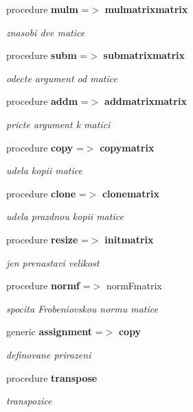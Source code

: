 \begin{DoxyCompactItemize}
procedure {\bf mulm} =$>$ {\bf mulmatrixmatrix}
\begin{DoxyCompactList}\small\item\em znasobi dve matice \end{DoxyCompactList}\item 
procedure {\bf subm} =$>$ {\bf submatrixmatrix}
\begin{DoxyCompactList}\small\item\em odecte argument od matice \end{DoxyCompactList}\item 
procedure {\bf addm} =$>$ {\bf addmatrixmatrix}
\begin{DoxyCompactList}\small\item\em pricte argument k matici \end{DoxyCompactList}\item 
procedure {\bf copy} =$>$ {\bf copymatrix}
\begin{DoxyCompactList}\small\item\em udela kopii matice \end{DoxyCompactList}\item 
procedure {\bf clone} =$>$ {\bf clonematrix}
\begin{DoxyCompactList}\small\item\em udela prazdnou kopii matice \end{DoxyCompactList}\item 
procedure {\bf resize} =$>$ {\bf initmatrix}
\begin{DoxyCompactList}\small\item\em jen prenastavi velikost \end{DoxyCompactList}\item 
procedure {\bf normf} =$>$ norm\+Fmatrix
\begin{DoxyCompactList}\small\item\em spocita Frobeniovskou normu matice \end{DoxyCompactList}\item 
generic {\bf assignment} =$>$ {\bf copy}
\begin{DoxyCompactList}\small\item\em definovane prirazeni \end{DoxyCompactList}\item 
procedure {\bf transpose}
\begin{DoxyCompactList}\small\item\em transpozice \end{DoxyCompactList}\item 

\end{DoxyCompactItemize}
